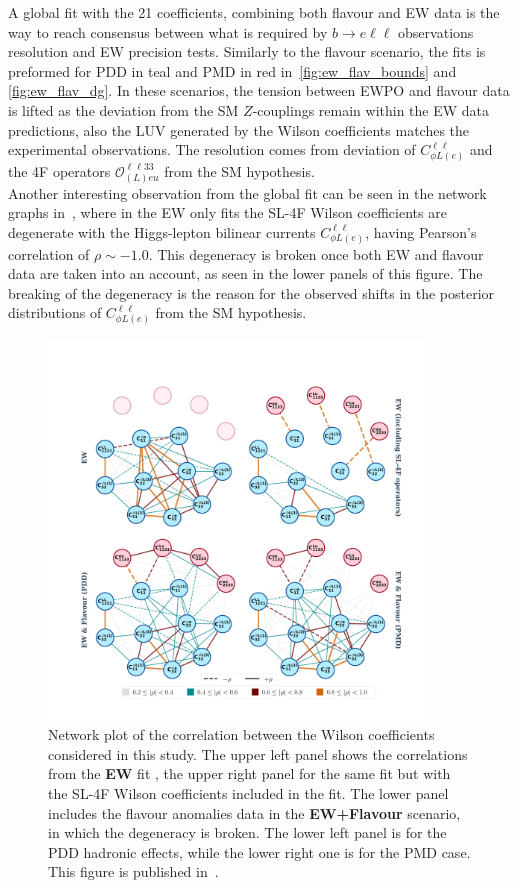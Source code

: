 A global fit  with the 21 coefficients, combining both flavour and EW data is the way to reach consensus between what is required by $ b \to e \ell \ell$ observations resolution and EW precision tests. Similarly to the flavour scenario, the fits is preformed for PDD in \textcolor[HTML]{0f7678}{teal}  and PMD in \textcolor[HTML]{760003}{red} in~\autoref{fig:ew_flav_bounds} and \autoref{fig:ew_flav_dg}. In these scenarios, the tension between EWPO and flavour data is lifted as the deviation from the SM $Z$-couplings remain within the EW data predictions, also the LUV generated by the Wilson coefficients matches the experimental observations. The resolution comes from deviation of $C_{\phi L (e)}^{\ell \ell}$ and the 4F operators $\mathcal{O}_{(L)eu}^{\ell \ell 3 3}$ from the SM hypothesis. \\ Another interesting observation from the global fit can be seen in the network graphs in~\cite{fig:ew_flav_corr}, where in the EW only fits the SL-4F Wilson coefficients are degenerate with the Higgs-lepton bilinear currents $C_{\phi L (e)}^{\ell \ell}$, having Pearson's correlation of  $\rho \sim -1.0$. This degeneracy is broken once both EW and flavour data are taken into an account, as seen in the lower panels of this figure. The breaking of the degeneracy is the reason for the observed shifts in the posterior distributions of $C_{\phi L (e)}^{\ell \ell}$ from the SM hypothesis. \\
\begin{figure}[h!]
	\centering
	\includegraphics[width=0.9\textwidth]{figures/fixed_EW_flavour.pdf}
	\caption{ Network plot of the correlation between the Wilson coefficients considered in this study. The upper left panel shows the correlations from the \textbf{EW} fit , the upper right panel for the same fit but with the SL-4F Wilson coefficients included in the fit. The lower panel includes the flavour anomalies data  in the \textbf{EW+Flavour}  scenario, in which the degeneracy is broken. The lower left panel is for the PDD hadronic effects, while the lower right one is for the PMD case. This figure is published in~\cite{Alasfar:2020mne}. 
	}
	\label{fig:ew_flav_corr}
\end{figure}

